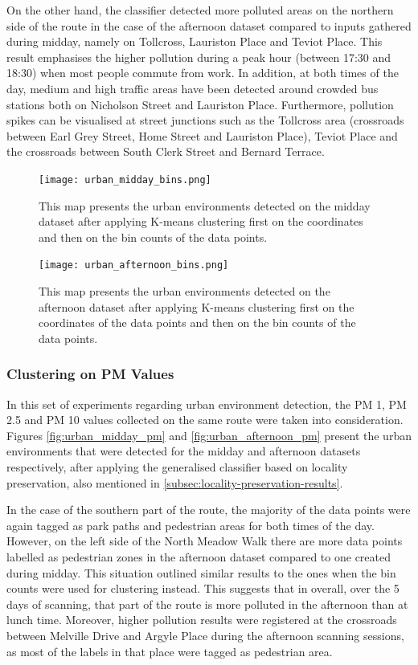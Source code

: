 \documentclass[bsc,frontabs,twoside,singlespacing,parskip,deptreport]{infthesis}     %
\begin{document}
On the other hand, the classifier detected more polluted areas on the northern side of the route in the case of the afternoon dataset compared to inputs gathered during midday, namely on Tollcross, Lauriston Place and Teviot Place. This result emphasises the higher pollution during a peak hour (between 17:30 and 18:30) when most people commute from work. In addition, at both times of the day, medium and high traffic areas have been detected around crowded bus stations both on Nicholson Street and Lauriston Place. Furthermore, pollution spikes can be visualised at street junctions such as the Tollcross area (crossroads between Earl Grey Street, Home Street and Lauriston Place), Teviot Place and the crossroads between South Clerk Street and Bernard Terrace.


\begin{figure}[h!]
  \center
  \texttt{[image: urban\_midday\_bins.png]}
  \caption{This map presents the urban environments detected on the midday dataset after applying K-means clustering first on the coordinates and then on the bin counts of the data points.}
  \label{fig:urban_midday_bins}
\end{figure}

\begin{figure}[h!]
  \center
  \texttt{[image: urban\_afternoon\_bins.png]}
  \caption{This map presents the urban environments detected on the afternoon dataset after applying K-means clustering first on the coordinates of the data points and then on the bin counts of the data points.}
  \label{fig:urban_afternoon_bins}
\end{figure}

\subsubsection*{Clustering on PM Values}

In this set of experiments regarding urban environment detection, the PM 1, PM 2.5 and PM 10 values collected on the same route were taken into consideration. Figures \ref{fig:urban_midday_pm} and \ref{fig:urban_afternoon_pm} present the urban environments that were detected for the midday and afternoon datasets respectively, after applying the generalised classifier based on locality preservation, also mentioned in \ref{subsec:locality-preservation-results}.

In the case of the southern part of the route, the majority of the data points were again tagged as park paths and pedestrian areas for both times of the day. However, on the left side of the North Meadow Walk there are more data points labelled as pedestrian zones in the afternoon dataset compared to one created during midday. This situation outlined similar results to the ones when the bin counts were used for clustering instead. This suggests that in overall, over the 5 days of scanning, that part of the route is more polluted in the afternoon than at lunch time. Moreover, higher pollution results were registered at the crossroads between Melville Drive and Argyle Place during the afternoon scanning sessions, as most of the labels in that place were tagged as pedestrian area.
\end{document}
